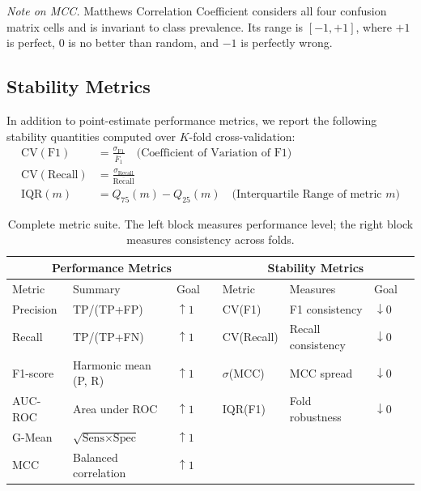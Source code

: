 \documentclass[11pt,a4paper]{article}
\newcommand{\CV}{\mathrm{CV}}
\begin{document}
\textit{Note on MCC.} Matthews Correlation Coefficient considers all four confusion matrix
cells and is invariant to class prevalence. Its range is $[-1,+1]$, where $+1$ is perfect,
$0$ is no better than random, and $-1$ is perfectly wrong.

\subsection{Stability Metrics}

In addition to point-estimate performance metrics, we report the following stability quantities
computed over $K$-fold cross-validation:
\begin{align}
  \CV(\text{F1}) &= \frac{\sigma_{\text{F1}}}{\bar{F}_1}
                  \quad\text{(Coefficient of Variation of F1)} \label{eq:cvf1}\\[4pt]
  \CV(\text{Recall}) &= \frac{\sigma_{\text{Recall}}}{\overline{\text{Recall}}} \label{eq:cvrec}\\[4pt]
  \mathrm{IQR}(m) &= Q_{75}(m) - Q_{25}(m)
                   \quad\text{(Interquartile Range of metric }m\text{)} \label{eq:iqr}
\end{align}

\begin{table}[ht]
\centering
\caption{Complete metric suite. The left block measures performance level; the right block
measures consistency across folds.}
\begin{tabular}{llll|llll}
\toprule
\multicolumn{4}{c|}{\textbf{Performance Metrics}} & \multicolumn{4}{c}{\textbf{Stability Metrics}} \\
\midrule
Metric     & Summary               & Goal & & Metric         & Measures          & Goal & \\
\midrule
Precision  & TP/(TP+FP)            & $\uparrow 1$ & & CV(F1)     & F1 consistency    & $\downarrow 0$ & \\
Recall     & TP/(TP+FN)            & $\uparrow 1$ & & CV(Recall) & Recall consistency& $\downarrow 0$ & \\
F1-score   & Harmonic mean (P, R)  & $\uparrow 1$ & & $\sigma$(MCC) & MCC spread     & $\downarrow 0$ & \\
AUC-ROC    & Area under ROC        & $\uparrow 1$ & & IQR(F1)    & Fold robustness   & $\downarrow 0$ & \\
G-Mean     & $\sqrt{\text{Sens}\times\text{Spec}}$ & $\uparrow 1$ & & & & & \\
MCC        & Balanced correlation  & $\uparrow 1$ & & & & & \\
\bottomrule
\end{tabular}
\end{table}
\end{document}

